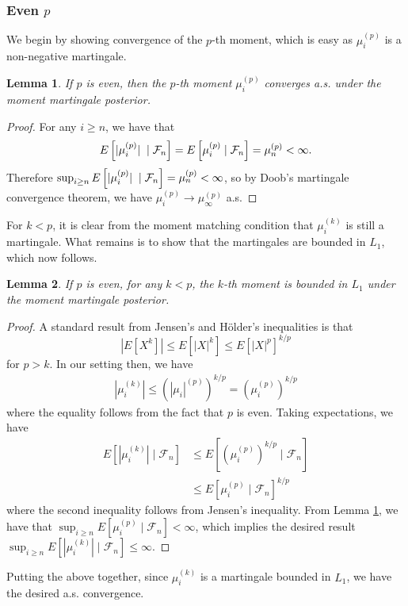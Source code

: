 \documentclass[11pt,a4paper]{article}
\theoremstyle{plain}
\newtheorem{lemma}{Lemma}
\theoremstyle{remark}
\theoremstyle{remark}
\begin{document}
\subsubsection{Even $p$}
We begin by showing convergence of the $p$-th moment, which is easy as $\mu_i^{(p)}$ is a non-negative martingale.
\begin{lemma}\label{lem:positive moment} If $p$ is even, then the $p$-th moment $\mu_i^{(p)}$ converges a.s. under the moment martingale posterior.
\end{lemma}
\begin{proof} For any $i \geq n$, we have that
\begin{align*}
E\left[|\mu^{(p)}_i| \hspace{0.1cm} \mid \mathcal{F}_n\right]\nonumber= E\left[\mu^{(p)}_i \mid \mathcal{F}_n\right]  = \mu^{(p)}_n < \infty.
\end{align*}
Therefore $\sup_{i \geq n} E\left[|\mu^{(p)}_i| \hspace{0.1cm} \mid \mathcal{F}_n\right] = \mu^{(p)}_n < \infty$, so by Doob's martingale convergence theorem, we have
$\mu^{(p)}_i \to \mu^{(p)}_\infty$ a.s.
\end{proof}
For $k < p$, it is clear from the moment matching condition that $\mu_i^{(k)}$ is still a martingale. What remains is to show that the martingales are bounded in $L_1$, which now follows.
\begin{lemma}\label{lem:pImplyLower} If $p$ is even, for any $k < p$, the $k$-th moment is bounded in $L_1$ under the moment martingale posterior.
\end{lemma}
\begin{proof} 
A standard result from Jensen's and H\"{o}lder's inequalities is that 
$$
\left|E\left[X^k\right]\right| \leq E\left[\left|X\right|^k\right]\leq E\left[\left|X \right|^p\right]^{k/p}
$$
for $p > k$. In our setting then, we have
\begin{align*}
    \left|\mu_i^{(k)} \right| \leq \left(\left|\mu_i\right|^{(p)}\right)^{k/p} = \left(\mu_i^{(p)}\right)^{k/p}  
\end{align*}
where the equality follows from the fact that $p$ is even. Taking expectations, we have 
\begin{align*}
    E\left[\left|\mu_i^{(k)} \right|\mid \mathcal{F}_n\right] &\leq E\left[\left(\mu_i^{(p)}\right)^{k/p} \mid \mathcal{F}_n \right]  \\
    &\leq E\left[\mu_i^{(p)} \mid \mathcal{F}_n \right]^{k/p} \end{align*}
    where the second inequality follows from Jensen's inequality.
From Lemma \ref{lem:positive moment}, we have that $\sup_{i \geq n}E\left[\mu_i^{(p)} \mid \mathcal{F}_n \right] < \infty$, which implies the desired result
$\sup_{i \geq n} E\left[\left|\mu_i^{(k)} \right|\mid \mathcal{F}_n\right] \leq \infty$.
\end{proof}
Putting the above together, since $\mu_i^{(k)}$ is a martingale bounded in $L_1$, we have the desired a.s. convergence.
\end{document}
